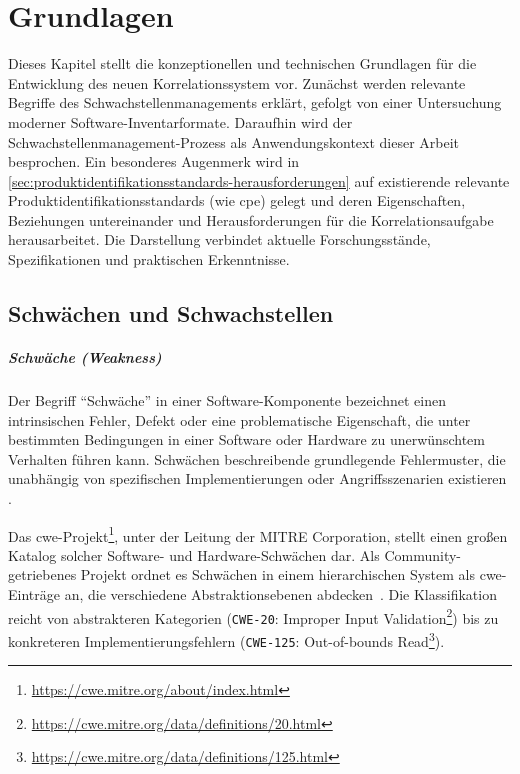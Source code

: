 \chapter{Grundlagen}\label{ch:grundlagen}

Dieses Kapitel stellt die konzeptionellen und technischen Grundlagen für die Entwicklung des neuen Korrelationssystem vor.
Zunächst werden relevante Begriffe des Schwachstellenmanagements erklärt, gefolgt von einer Untersuchung moderner Software-Inventarformate.
Daraufhin wird der Schwachstellenmanagement-Prozess als Anwendungskontext dieser Arbeit besprochen.
Ein besonderes Augenmerk wird in \autoref{sec:produktidentifikationsstandards-herausforderungen} auf existierende relevante Produktidentifikationsstandards (wie \acrshort{cpe}) gelegt und deren Eigenschaften, Beziehungen untereinander und Herausforderungen für die Korrelationsaufgabe herausarbeitet.
Die Darstellung verbindet aktuelle Forschungsstände, Spezifikationen und praktischen Erkenntnisse.

\section{Schwächen und Schwachstellen}\label{sec:def-weakness-vulnerability}

\paragraph{Schwäche (Weakness)}

Der Begriff \enquote{Schwäche} in einer Software-Komponente bezeichnet einen intrinsischen Fehler, Defekt oder eine problematische Eigenschaft, die unter bestimmten Bedingungen in einer Software oder Hardware zu unerwünschtem Verhalten führen kann.
Schwächen beschreibende grundlegende Fehlermuster, die unabhängig von spezifischen Implementierungen oder Angriffsszenarien existieren \autocite{Ross_Winstead_McEvilley_2022}.

Das \acrfull{cwe}-Projekt\footnote{\url{https://cwe.mitre.org/about/index.html}}, unter der Leitung der MITRE Corporation, stellt einen großen Katalog solcher Software- und Hardware-Schwächen dar.
Als Community-getriebenes Projekt ordnet es Schwächen in einem hierarchischen System als \acrshort{cwe}-Einträge an, die verschiedene Abstraktionsebenen abdecken\ \autocite{wu2016cwe}.
Die Klassifikation reicht von abstrakteren Kategorien (\verb+CWE-20+: Improper Input Validation\footnote{\url{https://cwe.mitre.org/data/definitions/20.html}}) bis zu konkreteren Implementierungsfehlern (\verb+CWE-125+: Out-of-bounds Read\footnote{\url{https://cwe.mitre.org/data/definitions/125.html}}).

